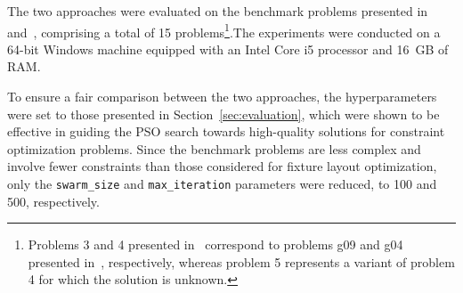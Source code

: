 The two approaches were evaluated on the benchmark problems presented in~\cite{hu2002solving} and~\cite{parsopoulos2002particle}, comprising a total of 15 problems\footnote{Problems 3 and 4 presented in~\cite{parsopoulos2002particle} correspond to problems g09 and g04 presented in~\cite{hu2002solving}, respectively, whereas problem 5 represents a variant of problem 4 for which the solution is unknown.}.The experiments were conducted on a 64-bit Windows machine equipped with an Intel Core i5 processor and 16~GB of RAM. 

To ensure a fair comparison between the two approaches, the hyperparameters were set to those presented in Section~\ref{sec:evaluation}, which were shown to be effective in guiding the PSO search towards high-quality solutions for constraint optimization problems. Since the benchmark problems are less complex and involve fewer constraints than those considered for fixture layout optimization, only the \texttt{swarm\_size} and \texttt{max\_iteration} parameters were reduced, to 100 and 500, respectively.


